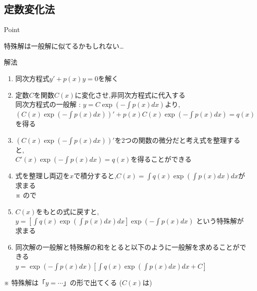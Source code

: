 \documentclass[a4paper]{jsarticle}
\begin{document}
\subsection{定数変化法}
\begin{itembox}[l]{Point}
    \begin{center}
        特殊解は一般解に似てるかもしれない\dots
    \end{center}
\end{itembox}
\begin{itembox}[l]{解法}
    \begin{enumerate}[(1)]
        \item 同次方程式$y'+p\left(x\right)y=0$を解く
        \item 定数$C$を関数$C\left(x\right)$に変化させ,非同次方程式に代入する\\
              同次方程式の一般解 : $y=C\exp\left(-\int p\left(x\right)dx\right)$より,\\
              $\left(C\left(x\right)\exp\left(-\int p\left(x\right)dx\right)\right)'+p\left(x\right)C\left(x\right)\exp\left(-\int p\left(x\right)dx\right)=q\left(x\right)$を得る
        \item $\left(C\left(x\right)\exp\left(-\int p\left(x\right)dx\right)\right)'$を2つの関数の微分だと考え式を整理すると,\\
              $C'\left(x\right)\exp\left(-\int p\left(x\right)dx\right)=q\left(x\right)$を得ることができる
        \item 式を整理し両辺を$x$で積分すると,$C\left(x\right)=\int q\left(x\right)\exp\left(\int p\left(x\right)dx\right)dx$が求まる\\
              ※ ので
        \item $C\left(x\right)$をもとの式に戻すと,$y=\left[\int q\left(x\right)\exp\left(\int p\left(x\right)dx\right)dx\right]\exp\left(-\int p\left(x\right)dx\right)$
              という特殊解が求まる
        \item 同次解の一般解と特殊解の和をとると以下のように一般解を求めることができる\\
              $y=\exp\left(-\int p\left(x\right)dx\right)\left[\int q\left(x\right)\exp\left(\int p\left(x\right)dx\right)dx+C\right]$
    \end{enumerate}
\end{itembox}
※ 特殊解は「$y=\cdots$」の形で出てくる ($C\left(x\right)$は)\\
\end{document}
